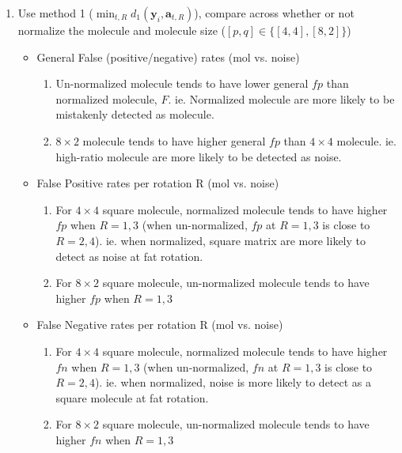 \documentclass[11pt]{article}
\newcommand{\by}{\boldsymbol{y}}
\begin{document}
    \begin{enumerate}
        \item Use method 1 ($\min_{t,R} d_{1}(\by_i,\mathbf{a}_{t,R})$), compare across whether or not normalize the molecule and molecule size ($[p,q] \in \{[4,4], [8,2]\}$)
        
        \begin{itemize}
        
            \item General False (positive/negative) rates (mol vs. noise)
            \begin{enumerate}
                \item Un-normalized molecule tends to have lower general $fp$ than normalized molecule, $F$. ie. Normalized molecule are more likely to be mistakenly detected as molecule.
                \item $8\times 2$ molecule tends to have higher general $fp$ than $4\times 4$ molecule. ie. high-ratio molecule are more likely to be detected as noise.
            \end{enumerate}
        
            \item False Positive rates per rotation R (mol vs. noise)
            \begin{enumerate}
                \item For $4\times 4$ square molecule, normalized molecule tends to have higher $fp$ when $R=1,3$ (when un-normalized, $fp$ at $R=1,3$ is close to $R=2,4$). ie. when normalized, square matrix are more likely to detect as noise at fat rotation.
                \item For $8\times 2$ square molecule, un-normalized molecule tends to have higher $fp$ when $R=1,3$
            \end{enumerate}
            
            \item False Negative rates per rotation R (mol vs. noise)
            \begin{enumerate}
                \item For $4\times 4$ square molecule, normalized molecule tends to have higher $fn$ when $R=1,3$ (when un-normalized, $fn$ at $R=1,3$ is close to $R=2,4$). ie. when normalized, noise is more likely to detect as a square molecule at fat rotation.
                \item For $8\times 2$ square molecule, un-normalized molecule tends to have higher $fn$ when $R=1,3$
            \end{enumerate}
        

\end{itemize}
\end{enumerate}
\end{document}
